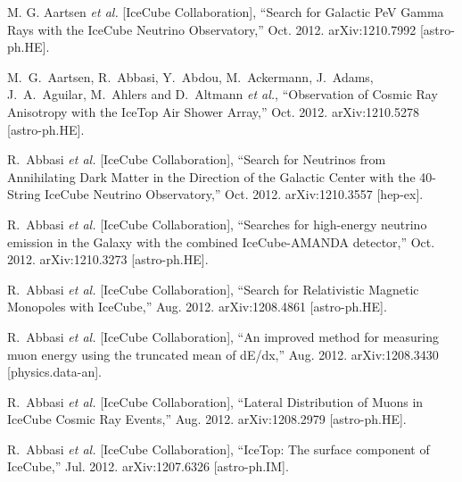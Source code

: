 \begin{enumerate}

  M. G. Aartsen {\it et al.}  [IceCube Collaboration],
  ``Search for Galactic PeV Gamma Rays with the IceCube Neutrino Observatory,'' Oct. 2012.
  arXiv:1210.7992 [astro-ph.HE].

  M.~G.~Aartsen, R.~Abbasi, Y.~Abdou, M.~Ackermann, J.~Adams, J.~A.~Aguilar, M.~Ahlers and D.~Altmann {\it et al.},
  ``Observation of Cosmic Ray Anisotropy with the IceTop Air Shower Array,'' Oct. 2012.
  arXiv:1210.5278 [astro-ph.HE].

  R.~Abbasi {\it et al.}  [IceCube Collaboration],
  ``Search for Neutrinos from Annihilating Dark Matter in the Direction of the Galactic Center with the 40-String IceCube Neutrino Observatory,'' Oct. 2012.
  arXiv:1210.3557 [hep-ex].

  R.~Abbasi {\it et al.}  [IceCube Collaboration],
  ``Searches for high-energy neutrino emission in the Galaxy with the combined IceCube-AMANDA detector,'' Oct. 2012.
  arXiv:1210.3273 [astro-ph.HE].

  R.~Abbasi {\it et al.}  [IceCube Collaboration],
  ``Search for Relativistic Magnetic Monopoles with IceCube,'' Aug. 2012.
  arXiv:1208.4861 [astro-ph.HE].

  R.~Abbasi {\it et al.}  [IceCube Collaboration],
  ``An improved method for measuring muon energy using the truncated mean of dE/dx,'' Aug. 2012.
  arXiv:1208.3430 [physics.data-an].

  R.~Abbasi {\it et al.}  [IceCube Collaboration],
  ``Lateral Distribution of Muons in IceCube Cosmic Ray Events,'' Aug. 2012.
  arXiv:1208.2979 [astro-ph.HE].

  R.~Abbasi {\it et al.}  [IceCube Collaboration],
  ``IceTop: The surface component of IceCube,'' Jul. 2012.
  arXiv:1207.6326 [astro-ph.IM].

\end{enumerate}



